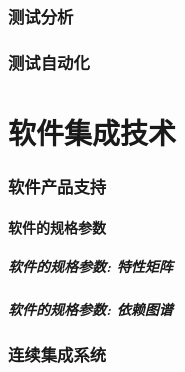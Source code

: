 \documentclass[CJK]{z-beamer}
\begin{document}
    \section {测试分析}
    \section {测试自动化}

\part {软件集成技术}

    \section {软件产品支持}
        \subsection{软件的规格参数}
            \begin{frame}
                \frametitle{软件的规格参数: 特性矩阵}
            \end{frame}

            \begin{frame}
                \frametitle{软件的规格参数: 依赖图谱}
            \end{frame}


    \section {连续集成系统}
\end{document}
